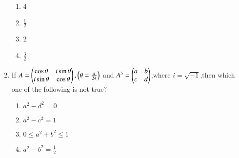 \documentclass[journal,12pt,twocolumn]{IEEEtran}
\theoremstyle{remark}
\begin{document}
\begin{enumerate}
\begin{enumerate}
    \item 4
    \item $\frac{1}{2}$
    \item 2
    \item $\frac{3}{2}$
\end{enumerate}
\item If $A=\begin{pmatrix}\cos\theta&i\sin\theta\\i\sin\theta&\cos\theta\end{pmatrix},\left(\theta=\frac{\pi}{24}\right)$ and $A^5=\begin{pmatrix}a&b\\c&d\end{pmatrix}$,where $i=\sqrt{-1}$,then which one of the following is not true?
\begin{enumerate}
    \item $a^2-d^2=0$
    \item $a^2-c^2=1$
    \item $0\leq a^2+b^2\leq1$
    \item $a^2-b^2=\frac{1}{2}$
\end{enumerate}

\end{enumerate}
\end{document}
